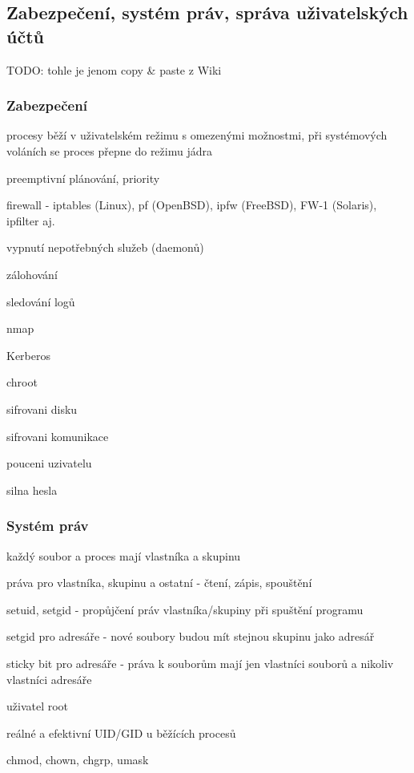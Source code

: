 \subsection{Zabezpečení, systém práv, správa uživatelských účtů}

TODO: tohle je jenom copy \& paste z Wiki

\subsubsection*{Zabezpečení}

\begin{pitemize}
  \item procesy běží v uživatelském režimu s omezenými možnostmi, při systémových voláních se proces přepne do režimu jádra
  \item preemptivní plánování, priority
  \item firewall - iptables (Linux), pf (OpenBSD), ipfw (FreeBSD), FW-1 (Solaris), ipfilter aj.
  \item vypnutí nepotřebných služeb (daemonů)
  \item zálohování
  \item sledování logů
  \item nmap
  \item Kerberos
  \item chroot
  \item sifrovani disku
  \item sifrovani komunikace
  \item pouceni uzivatelu
  \item silna hesla 
\end{pitemize}

\subsubsection*{Systém práv}

\begin{pitemize}
  \item každý soubor a proces mají vlastníka a skupinu
  \item práva pro vlastníka, skupinu a ostatní - čtení, zápis, spouštění
  \item setuid, setgid - propůjčení práv vlastníka/skupiny při spuštění programu
  \item setgid pro adresáře - nové soubory budou mít stejnou skupinu jako adresář
  \item sticky bit pro adresáře - práva k souborům mají jen vlastníci souborů a nikoliv vlastníci adresáře
  \item uživatel root
  \item reálné a efektivní UID/GID u běžících procesů
  \item chmod, chown, chgrp, umask 
\end{pitemize}

